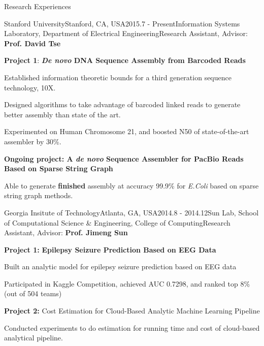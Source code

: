 \documentclass{resume} %
\begin{document}
\begin{rSection}{Research Experiences}

\begin{rSubsection}{Stanford University}{Stanford, CA, USA}{2015.7 - Present}{Information Systems Laboratory, Department of Electrical Engineering}{Research Assistant, Advisor: {\bf Prof. David Tse}}
\setlength\itemsep{-0.6em}
\item[] {\bf Project 1}: {\bf {\it De novo} DNA Sequence Assembly from Barcoded Reads}
\item Established information theoretic bounds for a third generation sequence technology, 10X. 
\item Designed algorithms to take advantage of barcoded linked reads to generate better assembly than state of the art. 
\item Experimented on Human Chromosome 21, and boosted N50 of state-of-the-art assembler by 30\%.
\item[] {\bf Ongoing project: A {\it de novo} Sequence Assembler for PacBio Reads Based on Sparse String Graph}
\item Able to generate {\bf finished} assembly at accuracy 99.9\% for {\it E.Coli} based on sparse string graph methods.
\end{rSubsection}


\begin{rSubsection}{Georgia Insitute of Technology}{Atlanta, GA, USA}{2014.8 - 2014.12}{Sun Lab, School of Computational Science \& Engineering,  College of Computing}{Research Assistant, Advisor: {\bf Prof. Jimeng Sun}}
\setlength\itemsep{-.6em}
\item[] {\bf Project 1:} {\bf Epilepsy Seizure Prediction Based on EEG Data}
\item Built an analytic model for epilepsy seizure prediction based on EEG data
\item Participated in Kaggle Competition, achieved AUC 0.7298, and ranked top 8\% (out of 504 teams)   
\item[] {\bf Project 2:} {Cost Estimation for Cloud-Based Analytic Machine Learning Pipeline }
\item Conducted experiments to do estimation for running time and cost of cloud-based analytical pipeline. 
\end{rSubsection}


\end{rSection}
\end{document}
